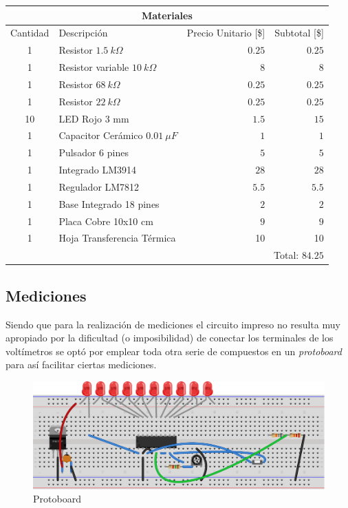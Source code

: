 \documentclass[12pt,a4paper]{article}
\begin{document}
		\begin{center}
			
			{\footnotesize \begin{tabular}{ |c|l|r|r| }

			\hline
				\multicolumn{4}{|c|}{\textbf{Materiales}}\\ \hline
				Cantidad & Descripción & Precio Unitario [\$] & Subtotal [\$] \\ \hline
				1 & Resistor $1.5 \: k\Omega$ & $0.25$ & $0.25$\\ \hline
				1 & Resistor variable $10 \: k\Omega$ & $8$& $8$ \\ \hline
				1 & Resistor $68 \: k\Omega$ & $0.25$&$0.25$ \\ \hline
				1 & Resistor $22 \: k\Omega$ & $0.25$& $0.25$\\ \hline
				10 & LED Rojo 3 mm & $1.5$ & $15$\\ \hline
				1 & Capacitor Cerámico $0.01 \: \mu F$ & $1$& $1$\\ \hline
				1 & Pulsador 6 pines & $5$ & $5$ \\ \hline
				1 & Integrado LM3914 & $28$ & $28$\\ \hline
				1 & Regulador LM7812 & $5.5$& $5.5$ \\ \hline
				1 & Base Integrado 18 pines & $2$& $2$ \\ \hline
				1 & Placa Cobre 10x10 cm & $9$& $9$ \\ \hline
				1 & Hoja Transferencia Térmica & 10 & 10\\ \hline
				\multicolumn{4}{|r|}{Total:  $84.25$}\\ \hline


			\end{tabular}}\label{tab:costo}
			\end{center}

		\subsection{Mediciones}

			Siendo que para la realización de mediciones el circuito impreso no resulta muy apropiado por la dificultad (o imposibilidad) de conectar los terminales de los voltímetros se optó por emplear toda otra serie de compuestos en un \textit{protoboard} para así facilitar ciertas mediciones.

			\begin{figure}[H]
			\centering
				\includegraphics[scale=1]{images/proto.pdf}\caption{Protoboard}\label{fig:proto}
			\end{figure}
\end{document}
